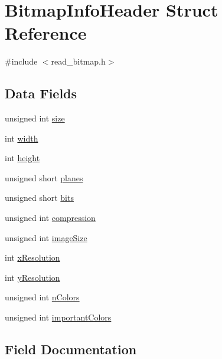 \hypertarget{struct_bitmap_info_header}{}\section{Bitmap\+Info\+Header Struct Reference}
\label{struct_bitmap_info_header}


{\ttfamily \#include $<$read\+\_\+bitmap.\+h$>$}

\subsection*{Data Fields}
\begin{DoxyCompactItemize}
\item 
unsigned int \hyperlink{struct_bitmap_info_header_aac913b3a1f6ef005d66bf7a84428773e}{size}
\item 
int \hyperlink{struct_bitmap_info_header_a2474a5474cbff19523a51eb1de01cda4}{width}
\item 
int \hyperlink{struct_bitmap_info_header_ad12fc34ce789bce6c8a05d8a17138534}{height}
\item 
unsigned short \hyperlink{struct_bitmap_info_header_a8c89d091e05544a82dc2398eed99634f}{planes}
\item 
unsigned short \hyperlink{struct_bitmap_info_header_a47d1d4d776f8fd3bb0f7dbc3c5aeb534}{bits}
\item 
unsigned int \hyperlink{struct_bitmap_info_header_ad180079f62b44e49ec672c9ef6e078b3}{compression}
\item 
unsigned int \hyperlink{struct_bitmap_info_header_adcd57a0168319e747bc8099218d3822c}{image\+Size}
\item 
int \hyperlink{struct_bitmap_info_header_ac6eaeb4c0876cf6cd899f41fe3c25ff5}{x\+Resolution}
\item 
int \hyperlink{struct_bitmap_info_header_aa2f350dd0bda750656d5db5f5e37b2b3}{y\+Resolution}
\item 
unsigned int \hyperlink{struct_bitmap_info_header_aed4506bad904845183194f199f1bdb98}{n\+Colors}
\item 
unsigned int \hyperlink{struct_bitmap_info_header_a8f7abfbc446b12f385d2b42c3b4fd9b0}{important\+Colors}
\end{DoxyCompactItemize}


\subsection{Field Documentation}
\hypertarget{struct_bitmap_info_header_a47d1d4d776f8fd3bb0f7dbc3c5aeb534}{}\label{struct_bitmap_info_header_a47d1d4d776f8fd3bb0f7dbc3c5aeb534} 
